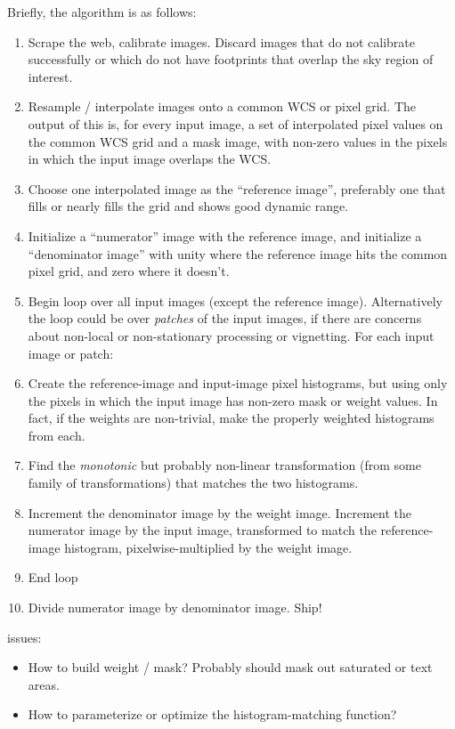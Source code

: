 \documentclass[12pt]{article}
\begin{document}
Briefly, the algorithm is as follows:
\begin{enumerate}
\item Scrape the web, calibrate images.  Discard images that do not
  calibrate successfully or which do not have footprints that overlap
  the sky region of interest.
\item Resample / interpolate images onto a common WCS or pixel grid.
  The output of this is, for every input image, a set of interpolated
  pixel values on the common WCS grid and a mask image, with non-zero
  values in the pixels in which the input image overlaps the WCS.
\item Choose one interpolated image as the ``reference image'',
  preferably one that fills or nearly fills the grid and shows good
  dynamic range.
\item Initialize a ``numerator'' image with the reference image, and
  initialize a ``denominator image'' with unity where the reference
  image hits the common pixel grid, and zero where it doesn't.
\item Begin loop over all input images (except the reference image).
  Alternatively the loop could be over \emph{patches} of the input
  images, if there are concerns about non-local or non-stationary
  processing or vignetting.  For each input image or patch:
\item Create the reference-image and input-image pixel histograms, but
  using only the pixels in which the input image has non-zero mask or
  weight values.  In fact, if the weights are non-trivial, make the
  properly weighted histograms from each.
\item Find the \emph{monotonic} but probably non-linear transformation
  (from some family of transformations) that matches the two
  histograms.
\item Increment the denominator image by the weight image.  Increment
  the numerator image by the input image, transformed to match the
  reference-image histogram, pixelwise-multiplied by the weight image.
\item End loop
\item Divide numerator image by denominator image.  Ship!
\end{enumerate}

issues:
\begin{itemize}
\item How to build weight / mask?  Probably should mask out saturated
  or text areas.
\item How to parameterize or optimize the histogram-matching function?
\end{itemize}

\end{document}
